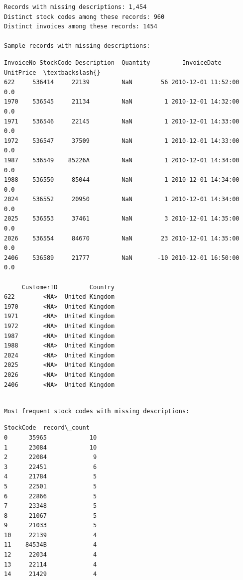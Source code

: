 \documentclass[11pt]{article}
\begin{document}
    \begin{Verbatim}[commandchars=\\\{\}]
Records with missing descriptions: 1,454
Distinct stock codes among these records: 960
Distinct invoices among these records: 1454

Sample records with missing descriptions:
    \end{Verbatim}

    
    \begin{Verbatim}[commandchars=\\\{\}]
     InvoiceNo StockCode Description  Quantity         InvoiceDate  UnitPrice  \textbackslash{}
622     536414     22139         NaN        56 2010-12-01 11:52:00        0.0   
1970    536545     21134         NaN         1 2010-12-01 14:32:00        0.0   
1971    536546     22145         NaN         1 2010-12-01 14:33:00        0.0   
1972    536547     37509         NaN         1 2010-12-01 14:33:00        0.0   
1987    536549    85226A         NaN         1 2010-12-01 14:34:00        0.0   
1988    536550     85044         NaN         1 2010-12-01 14:34:00        0.0   
2024    536552     20950         NaN         1 2010-12-01 14:34:00        0.0   
2025    536553     37461         NaN         3 2010-12-01 14:35:00        0.0   
2026    536554     84670         NaN        23 2010-12-01 14:35:00        0.0   
2406    536589     21777         NaN       -10 2010-12-01 16:50:00        0.0   

     CustomerID         Country  
622        <NA>  United Kingdom  
1970       <NA>  United Kingdom  
1971       <NA>  United Kingdom  
1972       <NA>  United Kingdom  
1987       <NA>  United Kingdom  
1988       <NA>  United Kingdom  
2024       <NA>  United Kingdom  
2025       <NA>  United Kingdom  
2026       <NA>  United Kingdom  
2406       <NA>  United Kingdom  
    \end{Verbatim}

    
    \begin{Verbatim}[commandchars=\\\{\}]

Most frequent stock codes with missing descriptions:
    \end{Verbatim}

    
    \begin{Verbatim}[commandchars=\\\{\}]
   StockCode  record\_count
0      35965            10
1      23084            10
2      22084             9
3      22451             6
4      21784             5
5      22501             5
6      22866             5
7      23348             5
8      21067             5
9      21033             5
10     22139             4
11    84534B             4
12     22034             4
13     22114             4
14     21429             4
    \end{Verbatim}
\end{document}
